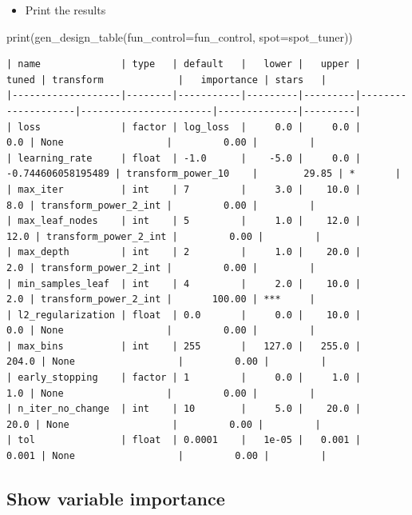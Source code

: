 \documentclass[
  letterpaper,
  DIV=11,
  numbers=noendperiod]{scrreprt}
\newenvironment{Shaded}{\begin{snugshade}}{\end{snugshade}}
\newcommand{\BuiltInTok}[1]{\textcolor[rgb]{0.00,0.23,0.31}{#1}}
\newcommand{\NormalTok}[1]{\textcolor[rgb]{0.00,0.23,0.31}{#1}}
\newcommand{\OperatorTok}[1]{\textcolor[rgb]{0.37,0.37,0.37}{#1}}
\providecommand{\tightlist}{%
  \setlength{\itemsep}{0pt}\setlength{\parskip}{0pt}}\usepackage{longtable,booktabs,array}
\begin{document}
\begin{itemize}
\tightlist
\item
  Print the results
\end{itemize}

\begin{Shaded}
\begin{Highlighting}[]
\BuiltInTok{print}\NormalTok{(gen\_design\_table(fun\_control}\OperatorTok{=}\NormalTok{fun\_control,}
\NormalTok{    spot}\OperatorTok{=}\NormalTok{spot\_tuner))}
\end{Highlighting}
\end{Shaded}

\begin{verbatim}
| name              | type   | default   |   lower |   upper |              tuned | transform             |   importance | stars   |
|-------------------|--------|-----------|---------|---------|--------------------|-----------------------|--------------|---------|
| loss              | factor | log_loss  |     0.0 |     0.0 |                0.0 | None                  |         0.00 |         |
| learning_rate     | float  | -1.0      |    -5.0 |     0.0 | -0.744606058195489 | transform_power_10    |        29.85 | *       |
| max_iter          | int    | 7         |     3.0 |    10.0 |                8.0 | transform_power_2_int |         0.00 |         |
| max_leaf_nodes    | int    | 5         |     1.0 |    12.0 |               12.0 | transform_power_2_int |         0.00 |         |
| max_depth         | int    | 2         |     1.0 |    20.0 |                2.0 | transform_power_2_int |         0.00 |         |
| min_samples_leaf  | int    | 4         |     2.0 |    10.0 |                2.0 | transform_power_2_int |       100.00 | ***     |
| l2_regularization | float  | 0.0       |     0.0 |    10.0 |                0.0 | None                  |         0.00 |         |
| max_bins          | int    | 255       |   127.0 |   255.0 |              204.0 | None                  |         0.00 |         |
| early_stopping    | factor | 1         |     0.0 |     1.0 |                1.0 | None                  |         0.00 |         |
| n_iter_no_change  | int    | 10        |     5.0 |    20.0 |               20.0 | None                  |         0.00 |         |
| tol               | float  | 0.0001    |   1e-05 |   0.001 |              0.001 | None                  |         0.00 |         |
\end{verbatim}

\hypertarget{show-variable-importance-2}{%
\subsection{Show variable importance}\label{show-variable-importance-2}}
\end{document}

